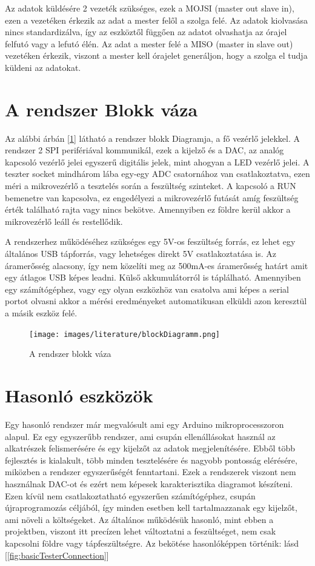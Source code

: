 Az adatok küldésére 2 vezeték szükséges, ezek a MOJSI (master out slave in), ezen a
vezetéken érkezik az adat a mester felől a szolga felé. Az adatok kiolvasása nincs
standardizálva, így az eszköztől függően az adatot olvashatja az órajel felfutó vagy a 
lefutó élén. Az adat a mester felé a MISO (master in slave out) vezetéken érkezik,
viszont a mester kell órajelet generáljon, hogy a szolga el tudja küldeni az adatokat.

\section{A rendszer Blokk váza}

Az alábbi árbán [\ref{fig:blockDiagramm}] látható a rendszer blokk Diagramja, a fő vezérlő jelekkel.
A rendszer 2 SPI perifériával kommunikál, ezek a kijelző és a DAC, az analóg kapcsoló vezérlő jelei 
egyszerű digitális jelek, mint ahogyan a LED vezérlő jelei. A teszter socket mindhárom lába egy-egy ADC
csatornához van csatlakoztatva, ezen méri a mikrovezérlő a tesztelés során a feszültség szinteket.
A kapcsoló a RUN bemenetre van kapcsolva, ez engedélyezi a mikrovezérlő futását amíg feszültség érték 
található rajta vagy nincs bekötve. Amennyiben ez földre kerül akkor a mikrovezérlő leáll és restellődik.

A rendszerhez működéséhez szükséges egy 5V-os feszültség forrás, ez lehet egy általános USB
tápforrás, vagy lehetséges direkt 5V csatlakoztatása is. Az áramerősség alacsony, így nem közelíti
meg az 500mA-es áramerősség határt amit egy átlagos USB képes leadni. Külső akkumulátorról
is táplálható. Amennyiben egy számítógéphez, vagy egy olyan eszközhöz van csatolva ami képes 
a serial portot olvasni akkor a mérési eredményeket automatikusan elküldi azon keresztül a 
másik eszköz felé. 


\begin{figure}[h]
    \centering
    \texttt{[image: images/literature/blockDiagramm.png]}
    \caption{A rendszer blokk váza}
    \label{fig:blockDiagramm}
\end{figure}


\section{Hasonló eszközök}

Egy hasonló rendszer már megvalósult \cite{similarSystem} ami egy Arduino 
\cite{ArduinoAtmega}
mikroprocesszoron alapul. Ez egy egyszerűbb rendszer, ami csupán ellenállásokat használ az 
alkatrészek felismerésére és egy kijelzőt az adatok megjelenítésére. Ebből több fejlesztés is 
kialakult, több minden tesztelésére és nagyobb pontosság elérésére, miközben a rendszer 
egyszerűségét fenntartani. Ezek a rendszerek viszont nem használnak DAC-ot és ezért nem képesek 
karakterisztika diagramot készíteni. Ezen kívül nem csatlakoztatható egyszerűen számítógéphez, 
csupán újraprogramozás céljából, így minden esetben kell tartalmazzanak egy kijelzőt, ami 
növeli a költségeket. Az általános működésük hasonló, mint ebben a projektben, viszont itt 
precízen lehet változtatni a feszültséget, nem csak kapcsolni földre vagy tápfeszültségre.
Az bekötése hasonlóképpen történik: lásd [\ref{fig:basicTesterConnection}]

